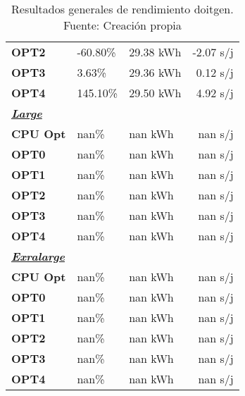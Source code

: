 \begin{table}[H]
\begin{tabular}{lllr}
    \cellcolor[HTML]{DAE8FC} \textbf{OPT2} & -60.80\%  &	29.38 kWh  &	-2.07 s/j \\
    \rowcolor[HTML]{EFEFEF} \cellcolor[HTML]{DAE8FC} \textbf{OPT3} &3.63\%  &	29.36 kWh  &	0.12 s/j \\
    \cellcolor[HTML]{DAE8FC} \textbf{OPT4} & 145.10\%  &	29.50 kWh  &	4.92 s/j \\
    \rowcolor[HTML]{EFEFEF} \cellcolor[HTML]{DAE8FC} \textbf{\textbf{{\emph{{\underline{{Large}}}}}}} &&	&	 \\
    \cellcolor[HTML]{DAE8FC} \textbf{CPU Opt} & nan\%  &	nan kWh  &	nan s/j \\
    \rowcolor[HTML]{EFEFEF} \cellcolor[HTML]{DAE8FC} \textbf{OPT0} &nan\%  &	nan kWh  &	nan s/j \\
    \cellcolor[HTML]{DAE8FC} \textbf{OPT1} & nan\%  &	nan kWh  &	nan s/j \\
    \rowcolor[HTML]{EFEFEF} \cellcolor[HTML]{DAE8FC} \textbf{OPT2} &nan\%  &	nan kWh  &	nan s/j \\
    \cellcolor[HTML]{DAE8FC} \textbf{OPT3} & nan\%  &	nan kWh  &	nan s/j \\
    \rowcolor[HTML]{EFEFEF} \cellcolor[HTML]{DAE8FC} \textbf{OPT4} &nan\%  &	nan kWh  &	nan s/j \\
    \cellcolor[HTML]{DAE8FC} \textbf{\textbf{{\emph{{\underline{{Exralarge}}}}}}} & &	&	 \\
    \rowcolor[HTML]{EFEFEF} \cellcolor[HTML]{DAE8FC} \textbf{CPU Opt} &nan\%  &	nan kWh  &	nan s/j \\
    \cellcolor[HTML]{DAE8FC} \textbf{OPT0} & nan\%  &	nan kWh  &	nan s/j \\
    \rowcolor[HTML]{EFEFEF} \cellcolor[HTML]{DAE8FC} \textbf{OPT1} &nan\%  &	nan kWh  &	nan s/j \\
    \cellcolor[HTML]{DAE8FC} \textbf{OPT2} & nan\%  &	nan kWh  &	nan s/j \\
    \rowcolor[HTML]{EFEFEF} \cellcolor[HTML]{DAE8FC} \textbf{OPT3} &nan\%  &	nan kWh  &	nan s/j \\
    \cellcolor[HTML]{DAE8FC} \textbf{OPT4} & nan\%  &	nan kWh  &	nan s/j \\
    \end{tabular}
    \caption[Resultados generales de rendimiento doitgen]{{Resultados generales de rendimiento doitgen. Fuente: Creación propia}}
    \label{table_global_doitgen_PowerResults_speedup-energy}
\end{table}